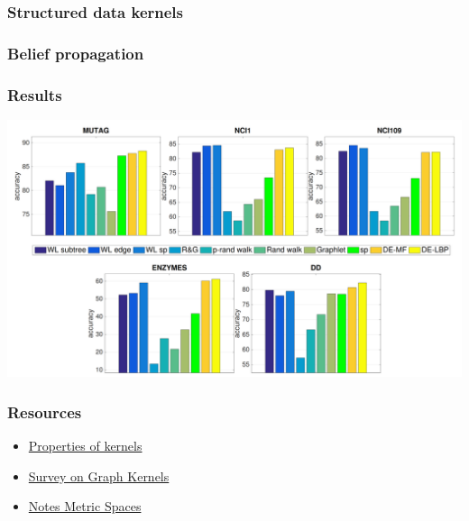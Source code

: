 \documentclass{beamer}
\begin{document}
    \begin{frame}
        \frametitle{Structured data kernels}
    \end{frame}

    \begin{frame}
        \frametitle{Belief propagation}
    \end{frame}

    \begin{frame}
        \frametitle{Results}
        \begin{center}
        \includegraphics[width=\textwidth]{results.png}
        \end{center}
    \end{frame}

    \begin{frame}
        \frametitle{Resources}
        \begin{itemize}
            \item \href{https://people.eecs.berkeley.edu/~jordan/kernels/0521813972c03_p47-84.pdf}{Properties of kernels} \\
            \item \href{https://arxiv.org/pdf/1903.11835.pdf}{Survey on Graph Kernels} \\
            \item \href{https://www.cs.mcgill.ca/~prakash/Courses/599/Notes/metric_spaces.pdf}{Notes Metric Spaces}
        \end{itemize}
    \end{frame}
\end{document}
